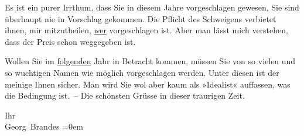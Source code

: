 \pstart
           Es ist ein purer Irrthum, dass Sie in diesem Jahre vorgeschlagen gewesen, Sie sind
               überhaupt nie in Vorschlag gekommen. Die Pflicht des Schweigens verbietet ihnen, mir
               mitzutheilen, \uline{wer} vorgeschlagen ist. Aber man lässt
               mich verstehen, dass der Preis schon weggegeben ist.\pend
           
\pstart
           Wollen Sie im \uline{folgenden} Jahr in Betracht kommen,
               müssen Sie  von so vielen und so wuchtigen
               Namen wie möglich vorgeschlagen werden. Unter diesen ist der meinige Ihnen sicher.
               Man wird Sie wol aber kaum als »Idealist« auffassen, was die Bedingung ist. – Die
               schönsten Grüsse in dieser traurigen Zeit.\pend
           
\pstart
           Ihr{\\[\baselineskip]}\spacefill\mbox{Georg Brandes}\pend
           \leftskip=0em{}\endnumbering{}  
      